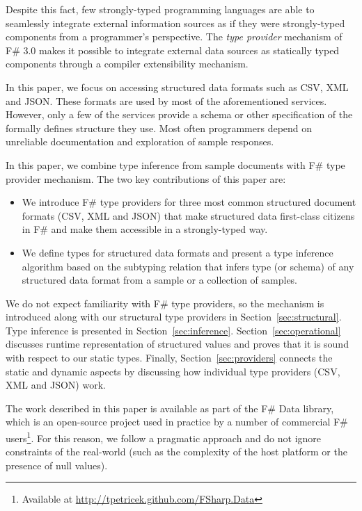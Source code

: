 \documentclass[10pt]{sigplanconf}
\newcommand{\ident}[1]{\textnormal{\sffamily #1}}
\begin{document}
Despite this fact, few strongly-typed programming languages are able to seamlessly integrate 
external information sources as if they were strongly-typed components from a programmer's 
perspective. The \emph{type provider} mechanism of F\# 3.0 \cite{providers-techreport} 
makes it possible to integrate external data sources as statically typed components
through a compiler extensibility mechanism. 

In this paper, we focus on accessing structured data formats such as CSV, XML and JSON. 
These formats are used by most of the aforementioned services. However, only a few of the
services provide a schema or other specification of the formally defines structure they use. 
Most often programmers depend on unreliable documentation and exploration of sample responses.

In this paper, we combine type inference from sample documents with F\# type provider mechanism.
The two key contributions of this paper are:

\begin{itemize}
\item We introduce F\# type providers for three most common structured document formats 
  (CSV, XML and JSON) that make structured data first-class citizens in F\# and make them
  accessible in a strongly-typed way.

\item We define types for structured data formats and present a type inference algorithm 
  based on the subtyping relation that infers type (or schema) of any structured 
  data format from a sample or a collection of samples.
\end{itemize}

We do not expect familiarity with F\# type providers, so the mechanism is introduced
along with our structural type providers in Section~\ref{sec:structural}. Type inference
is presented in Section~\ref{sec:inference}. Section~\ref{sec:operational} discusses
runtime representation of structured values and proves that it is sound with respect to
our static types. Finally, Section~\ref{sec:providers} connects the static and 
dynamic aspects by discussing how individual type providers (CSV, XML and JSON) work.

The work described in this paper is available as part of the F\# Data library, 
which is an open-source project used in practice by a number of commercial F\# users\footnote{
Available at \url{http://tpetricek.github.com/FSharp.Data}}. For this reason, we follow a 
pragmatic approach and do not ignore constraints of the real-world (such as the complexity
of the host platform or the presence of \ident{null} values).
\end{document}
